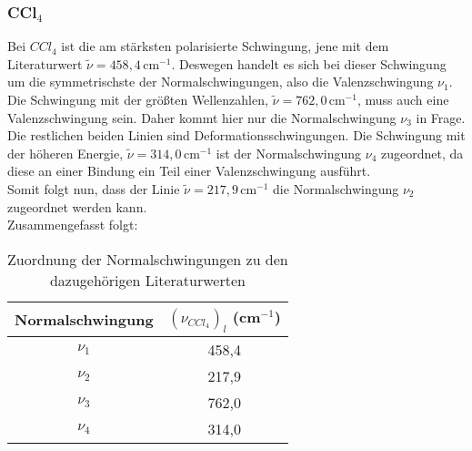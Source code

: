\subsubsection{CCl$_4$}
Bei $CCl_4$ ist die am stärksten polarisierte Schwingung, jene mit dem Literaturwert $\tilde{\nu}=458,4\,\text{cm}^{-1}$.
Deswegen handelt es sich bei dieser Schwingung um die symmetrischste der Normalschwingungen, also die Valenzschwingung $\nu_1$.\\
Die Schwingung mit der größten Wellenzahlen, $\tilde{\nu}=762,0\,\text{cm}^{-1}$, muss auch eine Valenzschwingung sein.
Daher kommt hier nur die Normalschwingung $\nu_3$ in Frage.\\
Die restlichen beiden Linien sind Deformationsschwingungen.
Die Schwingung mit der höheren Energie, $\tilde{\nu}=314,0\,\text{cm}^{-1}$ ist der Normalschwingung $\nu_4$ zugeordnet, da diese an einer Bindung ein Teil einer Valenzschwingung ausführt.\\
Somit folgt nun, dass der Linie $\tilde{\nu}=217,9\,\text{cm}^{-1}$ die Normalschwingung $\nu_2$ zugeordnet werden kann.\\
Zusammengefasst folgt:
\begin{table}[h]
    \centering\begin{tabular}{c|c}
        Normalschwingung & $(\nu_{CCl_4})_l$ (cm$^{-1}$)\\\hline
        $\nu_1$&458,4\\
        $\nu_2$&217,9\\
        $\nu_3$&762,0\\
        $\nu_4$&314,0      
    \end{tabular}
    \caption{Zuordnung der Normalschwingungen zu den dazugehörigen Literaturwerten}
\end{table}
